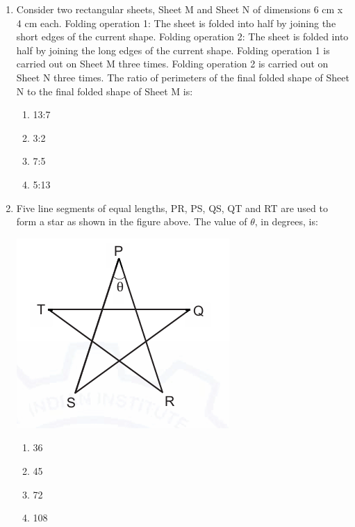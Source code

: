 \documentclass[journal,12pt,onecolumn]{IEEEtran}
\begin{document}
\begin{enumerate}
    \item Consider two rectangular sheets, Sheet M and Sheet N of dimensions 6 cm x 4 cm each. Folding operation 1: The sheet is folded into half by joining the short edges of the current shape. Folding operation 2: The sheet is folded into half by joining the long edges of the current shape. Folding operation 1 is carried out on Sheet M three times. Folding operation 2 is carried out on Sheet N three times. The ratio of perimeters of the final folded shape of Sheet N to the final folded shape of Sheet M is:
    \begin{multicols}{2}
    \begin{enumerate}
        \item 13:7
        \item 3:2
        \item 7:5
        \item 5:13
    \end{enumerate}
    \end{multicols}
    \hfill{}
    
    \item Five line segments of equal lengths, PR, PS, QS, QT and RT are used to form a star as shown in the figure above. The value of $\theta$, in degrees, is: 
    \begin{center}
    \includegraphics[width=0.4\columnwidth]{figs/q8.png}
    \end{center}
    \begin{multicols}{2}
    \begin{enumerate}
        \item 36
        \item 45
        \item 72
        \item 108
    \end{enumerate}
    \end{multicols}
    \hfill{}


\end{enumerate}
\end{document}

